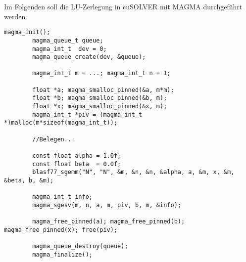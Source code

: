 		Im Folgenden soll die LU-Zerlegung in cuSOLVER mit MAGMA durchgeführt werden.
		\begin{lstlisting}[caption=MAGMA: CPU-Interface]
		magma_init();
		magma_queue_t queue;
		magma_int_t  dev = 0;
		magma_queue_create(dev, &queue);
  
		magma_int_t m = ...; magma_int_t n = 1;
                      
		float *a; magma_smalloc_pinned(&a, m*m);   
		float *b; magma_smalloc_pinned(&b, m);  
		float *x; magma_smalloc_pinned(&x, m);   
		magma_int_t *piv = (magma_int_t *)malloc(m*sizeof(magma_int_t));
		
		//Belegen...

		const float alpha = 1.0f;
		const float beta  = 0.0f;
		blasf77_sgemm("N", "N", &m, &n, &n, &alpha, a, &m, x, &m, &beta, b, &m);

		magma_int_t info;
		magma_sgesv(m, n, a, m, piv, b, m, &info);

		magma_free_pinned(a); magma_free_pinned(b); magma_free_pinned(x); free(piv);

		magma_queue_destroy(queue);
		magma_finalize();
		\end{lstlisting}
		
